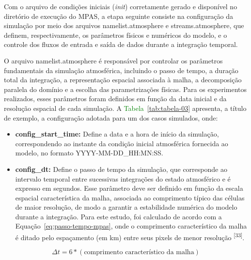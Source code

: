 \documentclass[12pt,a4paper,oneside]{book}
\begin{document}
Com o arquivo de condições iniciais (\emph{init}) corretamente gerado e disponível no diretório de execução do MPAS, a etapa seguinte consiste na configuração da simulação por meio dos arquivos namelist.atmosphere e streams.atmosphere, que definem, respectivamente, os parâmetros físicos e numéricos do modelo, e o controle dos fluxos de entrada e saída de dados durante a integração temporal.

O arquivo namelist.atmosphere é responsável por controlar os parâmetros fundamentais da simulação atmosférica, incluindo o passo de tempo, a duração total da integração, a representação espacial associada à malha, a decomposição paralela do domínio e a escolha das parametrizações físicas. Para os experimentos realizados, esses parâmetros foram definidos em função da data inicial e da resolução espacial de cada simulação. A \textcolor{green}{Tabela~\ref*{tab:tabela-03}} apresenta, a título de exemplo, a configuração adotada para um dos casos simulados, onde:

\begin{itemize}
\item
  \textbf{config\_start\_time:} Define a data e a hora de início da simulação, correspondendo ao instante da condição inicial atmosférica fornecida ao modelo, no formato YYYY-MM-DD\_HH:MN:SS.
\item
  \textbf{config\_dt:} Define o passo de tempo da simulação, que corresponde ao intervalo temporal entre sucessivas integrações do estado atmosférico e é expresso em segundos. Esse parâmetro deve ser definido em função da escala espacial característica da malha, associada ao comprimento típico das células de maior resolução, de modo a garantir a estabilidade numérica do modelo durante a integração. Para este estudo, foi calculado de acordo com a Equação~\ref{eq:passo-tempo-mpas}, onde o comprimento característico da malha é ditado pelo espaçamento (em km) entre seus pixels de menor resolução \textsuperscript{{[}33{]}}.
\end{itemize}

\begin{equation}
\label{eq:passo-tempo-mpas}
\Delta t = 6 \ast \left(\text{comprimento característico da malha}\right)
\end{equation}
\end{document}
